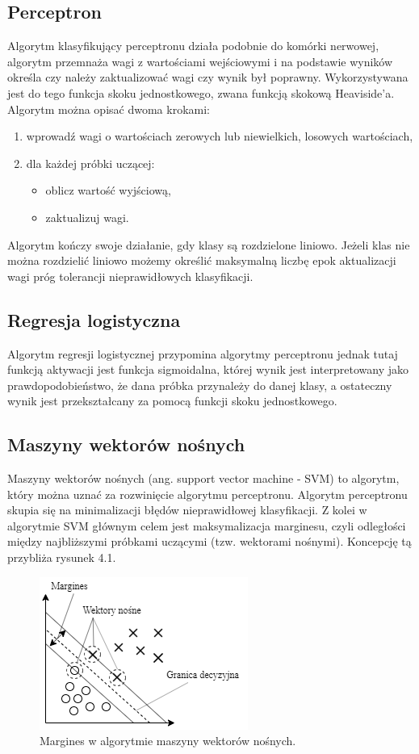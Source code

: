 \documentclass[printmode, eng, openany]{mgr}
\newcommand\tab[1][1cm]{\hspace*{#1}}
\begin{document}
\subsection{Perceptron}
\tab Algorytm klasyfikujący perceptronu działa podobnie do komórki nerwowej, algorytm przemnaża wagi z wartościami wejściowymi i na podstawie wyników określa czy należy zaktualizować wagi czy wynik był poprawny. Wykorzystywana jest do tego funkcja skoku jednostkowego, zwana funkcją skokową Heaviside'a. Algorytm można opisać dwoma krokami:
\begin{enumerate}
\item wprowadź wagi o wartościach zerowych lub niewielkich, losowych wartościach,
\item dla każdej próbki uczącej:
\begin{itemize}
\item oblicz wartość wyjściową,
\item zaktualizuj wagi.
\end{itemize}
\end{enumerate}

\tab Algorytm kończy swoje działanie, gdy klasy są rozdzielone liniowo. Jeżeli klas nie można rozdzielić liniowo możemy określić maksymalną liczbę epok aktualizacji wag\linebreak i próg tolerancji nieprawidłowych klasyfikacji. 

\subsection{Regresja logistyczna}
\tab Algorytm regresji logistycznej przypomina algorytmy perceptronu jednak tutaj funkcją aktywacji jest funkcja sigmoidalna, której wynik jest interpretowany jako prawdopodobieństwo, że dana próbka przynależy do danej klasy, a ostateczny wynik jest przekształcany za pomocą funkcji skoku jednostkowego.

\subsection{Maszyny wektorów nośnych}
\tab Maszyny wektorów nośnych (ang. support vector machine - SVM) to algorytm, który można uznać za rozwinięcie algorytmu perceptronu. Algorytm perceptronu skupia się na minimalizacji błędów nieprawidłowej klasyfikacji. Z kolei w algorytmie SVM głównym celem jest maksymalizacja marginesu, czyli odległości między najbliższymi próbkami uczącymi (tzw. wektorami nośnymi). Koncepcję tą przybliża rysunek 4.1. 
\begin{figure}[H]
\centering
\includegraphics{svm}
\caption{Margines w algorytmie maszyny wektorów nośnych.}
\end{figure}
\end{document}
